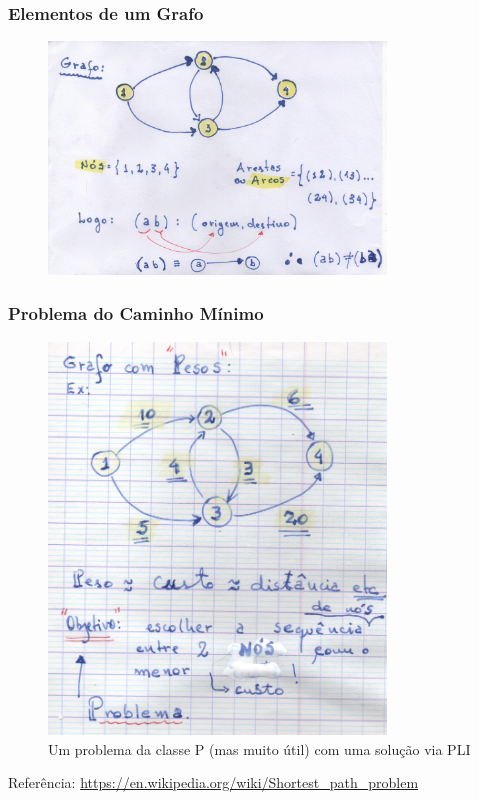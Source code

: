\documentclass{beamer}
\begin{document}
\begin{frame}
    \frametitle{Elementos de um Grafo}
    
    \begin{figure}[tbp]
     \includegraphics[keepaspectratio=true,width=0.8\textwidth , height=0.6\textheight]{01_elementos_de_um_grafo.pdf}
    \centering
    \end{figure}


\end{frame}
\begin{frame}
	\frametitle{Problema do Caminho Mínimo}
	
	\begin{figure}[tbp]
		\includegraphics[width=0.8\textwidth , height=0.6\textheight]{02_grafo_com_pesos.pdf}
		\centering
		\caption{Um problema da classe P (mas muito útil) com uma solução via PLI}
	\end{figure}
Referência: \url{https://en.wikipedia.org/wiki/Shortest_path_problem}
\end{frame}
\end{document}
